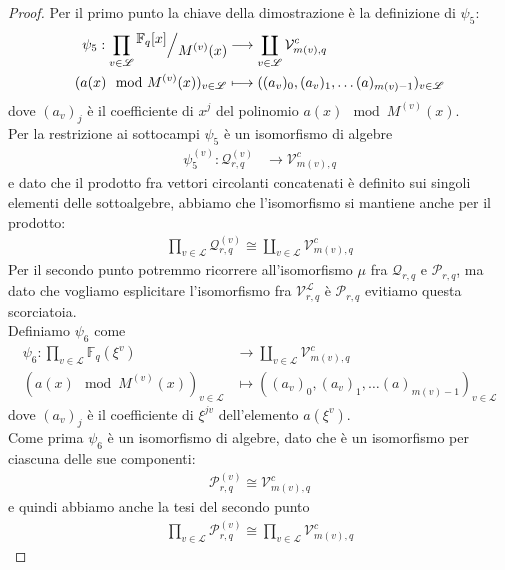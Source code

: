 \begin{proof}
   Per il primo punto la chiave della dimostrazione è la definizione di $\psi_{5}$:
   \begin{align*}
  \psi_{5} :  \prod_{v\in \mathscr{L}} \quotient{\mathbb{F}_{q} \lbrack x \rbrack  }{M^{(v)}(x)}
      & \longrightarrow
      \coprod_{v\in \mathscr{L} } \mathcal{V}_{m(v), q}^{c}   \\
      ( a(x) \mod{M^{(v)}(x)} )_{v \in \mathscr{L}}
      &\longmapsto
      ( (a_v )_0, (a_v)_1, \dots (a)_{m(v)-1})_{v \in \mathscr{L}}
  \end{align*}
  dove $(a_v)_{j}$ è il coefficiente di $x^j$ del polinomio $a(x) \mod{M^{(v)}(x)}$.\\
  Per la restrizione ai sottocampi $\psi_{5}$ è un isomorfismo di algebre
  \begin{align*}
  \psi_{5}^{(v)} :  \mathcal{Q}_{r,q}^{(v)}
      & \longrightarrow
     \mathcal{V}_{m(v), q}^{c}
  \end{align*}
  e dato che il prodotto fra vettori circolanti concatenati è definito sui singoli elementi delle sottoalgebre, abbiamo che l'isomorfismo si mantiene anche per il prodotto:
  \begin{align*}
     \prod_{v \in \mathscr{L} } \mathcal{Q}_{r,q}^{(v)}
     \cong
     \coprod_{v \in \mathscr{L} } \mathcal{V}_{m(v),q}^{c}
  \end{align*}
  Per il secondo punto potremmo ricorrere all'isomorfismo $\mu$ fra $\mathcal{Q}_{r,q}$ e $\mathcal{P}_{r,q}$, ma dato che vogliamo esplicitare l'isomorfismo fra $\mathcal{V}_{r,q}^{\mathscr{L}}$ è $\mathcal{P}_{r,q}$ evitiamo questa scorciatoia.\\
  Definiamo $\psi_{6}$ come
   \begin{align*}
  \psi_{6} :  \prod_{v\in \mathscr{L}} \mathbb{F}_{q} (\xi^{v})
      & \longrightarrow
      \coprod_{v\in \mathscr{L} } \mathcal{V}_{m(v), q}^{c}   \\
      ( a(x) \mod{M^{(v)}(x)} )_{v \in \mathscr{L}}
      &\longmapsto
      ( (a_v )_0, (a_v)_1, \dots (a)_{m(v)-1})_{v \in \mathscr{L}}
  \end{align*}
  dove $(a_v)_{j}$ è il coefficiente di $\xi^{jv}$ dell'elemento $a(\xi^{v})$.\\
  Come prima $\psi_{6}$ è un isomorfismo di algebre, dato che è un isomorfismo per ciascuna delle sue componenti:
  \begin{align*}
     \mathcal{P}_{r,q}^{(v)} \cong \mathcal{V}_{m(v),q}^{c}
  \end{align*}
  e quindi abbiamo anche la tesi del secondo punto
  \begin{align*}
     \prod_{v \in \mathscr{L} } \mathcal{P}_{r,q}^{(v)}
     \cong
     \prod_{v \in \mathscr{L} } \mathcal{V}_{m(v),q}^{c}
  \end{align*}
\end{proof}
